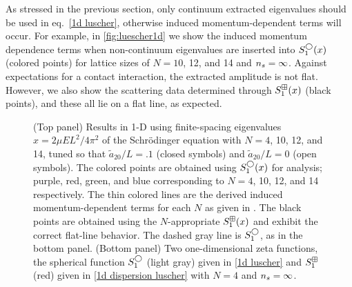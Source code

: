As stressed in the previous section, only continuum extracted eigenvalues should be used in eq.~\eqref{1d luscher}, otherwise induced momentum-dependent terms will occur.
For example, in \autoref{fig:luescher1d} we show the induced momentum dependence terms when non-continuum eigenvalues are inserted into $S^{\bigcirc}_1(x)$ (colored points) for lattice sizes of $N=10$, 12, and 14 and ${n_s}=\infty$.
Against expectations for a contact interaction, the extracted amplitude is not flat.
However, we also show the scattering data determined through $S^{\boxplus}_1(x)$ (black points), and these all lie on a flat line, as expected.

\begin{figure}
\center
    \center
    
    \caption{
        (Top panel)
        Results in 1-D using finite-spacing eigenvalues $x=2\mu EL^2/4\pi^2$ of the Schr\"odinger equation with $N=4$, 10, 12, and 14, tuned so that $\tilde a_{20}/L=.1$ (closed symbols) and $\tilde a_{20}/L=0$ (open symbols).
        The colored points are obtained using $S^\bigcirc_1(x)$ for analysis; purple, red, green, and blue corresponding to $N=4$, 10, 12, and 14 respectively.
        The thin colored lines are the derived induced momentum-dependent terms for each $N$ as given in .
        The black points are obtained using the $N$-appropriate $S^{\boxplus}_1(x)$ and exhibit the correct flat-line behavior.
        The dashed gray line is $S_1^\bigcirc$, as in the bottom panel.
        (Bottom panel)
        Two one-dimensional zeta functions, the spherical function $S_1^{\bigcirc}$ (light gray) given in \eqref{1d luscher} and $S_1^{\boxplus}$ (red) given in \eqref{1d dispersion luscher} with $N=4$ and ${n_s}=\infty$.
        }
        \label{fig:luescher1d}
\end{figure}

